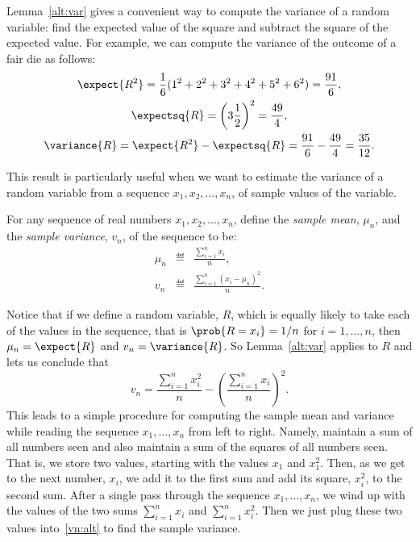 \begin{editingnotes}

Lemma~\ref{alt:var} gives a convenient way to compute the variance of a
random variable: find the expected value of the square and subtract the
square of the expected value.  For example, we can compute the variance of
the outcome of a fair die as follows:
\begin{gather*}
  \expect{R^2} = \frac{1}{6} (1^2 + 2^2 + 3^2 + 4^2 + 5^2 + 6^2) = \frac{91}{6}, \\
  \expectsq{R} = \left(3 \frac{1}{2}\right)^2 = \frac{49}{4}, \\
  \variance{R}  = \expect{R^2} - \expectsq{R}
  = \frac{91}{6} - \frac{49}{4} = \frac{35}{12}.
\end{gather*}

This result is particularly useful when we want to estimate the variance
of a random variable from a sequence $x_1,x_2,\dots,x_n$, of sample values
of the variable.

\begin{definition*}
For any sequence of real numbers $x_1,x_2,\dots,x_n$, define the
\emph{sample mean}, $\mu_n$, and the \emph{sample variance}, $v_n$, of the
sequence to be:
\begin{eqnarray*}
\mu_n  & \eqdef & \frac{\sum_{i=1}^n x_i}{n},\\
v_n  & \eqdef & \frac{\sum_{i=1}^n (x_i - \mu_n)^2}{n}.
\end{eqnarray*}
\end{definition*}
Notice that if we define a random variable, $R$, which is equally likely
to take each of the values in the sequence, that is $\prob{R = x_i} = 1/n$
for $i = 1,\dots,n$, then $\mu_n = \expect{R}$ and $v_n = \variance{R}$.
So Lemma~\ref{alt:var} applies to $R$ and lets us conclude that
\begin{equation}\label{vn:alt}
v_n = \frac{\sum_{i=1}^n x_i^2}{n} - \left(\frac{\sum_{i=1}^n x_i}{n}\right)^2.
\end{equation}
This leads to a simple procedure for computing the sample mean and
variance while reading the sequence $x_1,\dots,x_n$ from left to right.
Namely, maintain a sum of all numbers seen and also maintain a sum of the
squares of all numbers seen.  That is, we store two values, starting with
the values $x_1$ and $x_1^2$.  Then, as we get to the next number, $x_i$,
we add it to the first sum and add its square, $x_{i}^2$, to the second
sum.  After a single pass through the sequence $x_1,\dots,x_n$, we wind up
with the values of the two sums $\sum_{i=1}^n x_i$ and $\sum_{i=1}^n
x_i^2$.  Then we just plug these two values into~\eqref{vn:alt} to find
the sample variance.


\end{editingnotes}
